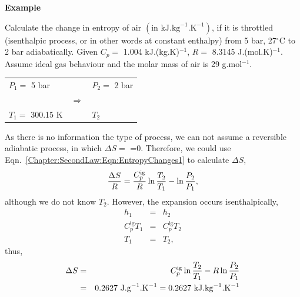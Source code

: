  
   \begin{MyExample}{\begin{center}{\bf Example}\end{center}}
     \begin{example}\label{Chapter:SecondLaw:Example4}\citep{Singh_Book}
        Calculate the change in entropy of air $\left(\text{in kJ.kg}^{-1}\text{.K}^{-1}\right)$, if it is throttled (\ie isenthalpic process, or in other words at constant enthalpy) from 5 bar, 27$^{\circ}$C to 2 bar adiabatically. Given $C_{p}=$ 1.004 kJ.(kg.K)$^{-1}$, $R=$ 8.3145 J.(mol.K)$^{-1}$. Assume ideal gas behaviour and the molar mass of air is 29 g.mol$^{-1}$.
     \end{example}

       \begin{center}
          \begin{tabular}{l c l}
             $P_{1}=$ 5 bar     &                           & $P_{2}=$ 2 bar \\
                               & \;\;$\Longrightarrow$\;\; &                \\
             $T_{1}=$ 300.15 K  &                           & $T_{2}$
       \end{tabular}
       \end{center}
       As there is no information \wrt the type of process, we can not assume a reversible adiabatic process, in which $\Delta S=$ =0. Therefore, we could use Eqn.~\ref{Chapter:SecondLaw:Eqn:EntropyChanges1} to calculate $\Delta S$, 
       \begin{displaymath}
          \displaystyle\frac{\Delta S}{R} = \displaystyle\frac{C_{p}^{\text{ig}}}{R}\ln{\displaystyle\frac{T_{2}}{T_{1}}} - \ln{\displaystyle\frac{P_{2}}{P_{1}}},
       \end{displaymath}
       although we do not know $T_{2}$. However, the expansion occurs isenthalpically, \ie 
       \begin{eqnarray}
            h_{1} &=& h_{2} \nonumber \\
            C_{p}^{\text{ig}}T_{1} &=& C_{p}^{\text{ig}}T_{2} \nonumber \\
            T_{1} &=& T_{2}, \nonumber
       \end{eqnarray}
       thus,
       \begin{eqnarray}
          \Delta S &=& C_{p}^{\text{ig}}\ln{\displaystyle\frac{T_{2}}{T_{1}}} - R\ln{\displaystyle\frac{P_{2}}{P_{1}}} \nonumber \\
                   &=& 0.2627\text{ J.g}^{-1}\text{.K}^{-1} = 0.2627\text{ kJ.kg}^{-1}\text{.K}^{-1} \nonumber
       \end{eqnarray}
   \end{MyExample}

